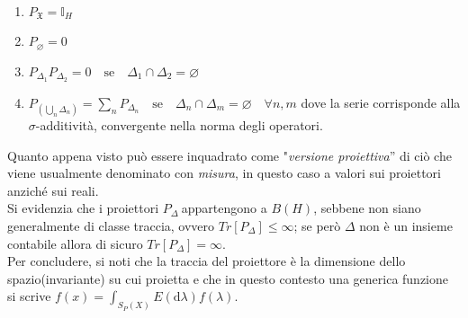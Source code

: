  \begin{enumerate}
\item $P_{\mathfrak{X}}=\mathbb{I}_{H}$
\item $P_{\varnothing}=0$
\item $P_{\Delta_1}P_{\Delta_2}=0 \quad \text{se} \quad \Delta_1\cap\Delta_2=\varnothing$
\item $P_{\left(\bigcup _n\Delta_n\right)}=\sum_n{P_{\Delta_n}} \quad \text{se} \quad \Delta_n\cap\Delta_m=\varnothing \quad \forall n,m$ dove la serie corrisponde alla $\sigma$-additività, convergente nella norma degli operatori.
  \end{enumerate}
Quanto appena visto può essere inquadrato come "\emph{versione proiettiva}'' di ciò che viene usualmente denominato con  \textit{misura}, in questo caso a valori sui proiettori anziché sui reali.\\
Si evidenzia che i proiettori $P_\varDelta\ $appartengono a $B(H)$, sebbene non siano generalmente di classe traccia, ovvero 
$\textit{Tr}[P_\varDelta]\leqslant\infty$; se però $\Delta$ non è un insieme contabile allora di sicuro $\textit{Tr}[P_\varDelta]=\infty$.\\
Per concludere, si noti che la traccia del proiettore è la dimensione dello spazio(invariante) su cui proietta e che in questo contesto una generica funzione si scrive $f(x)=\int_{S_P\left(X\right)}{E\left(\textrm{d}\lambda\right)f(\lambda)}$.

%